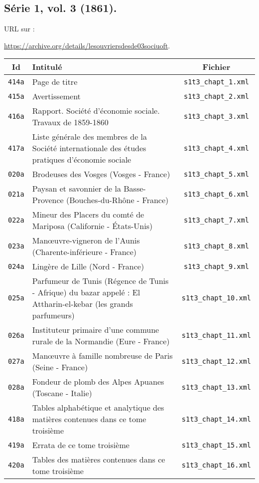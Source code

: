 \subsection{Série 1, vol. 3 (1861).}
\label{mappings1t3}

URL sur \ia{} : 

\url{https://archive.org/details/lesouvriersdesde03sociuoft}.

\begin{center}
\begin{longtable}{ | c | p{9.5cm} | c | }
\hline
Id & Intitulé & Fichier \\ \hline
\texttt{414a} & Page de titre & \texttt{s1t3\_chapt\_1.xml} \\ \hline
\texttt{415a} & Avertissement & \texttt{s1t3\_chapt\_2.xml} \\ \hline
\texttt{416a} & Rapport. Société d'économie sociale. Travaux de 1859-1860 & \texttt{s1t3\_chapt\_3.xml} \\ \hline
\texttt{417a} & Liste générale des membres de la Société internationale des études pratiques d'économie sociale & \texttt{s1t3\_chapt\_4.xml} \\ \hline
\texttt{020a} & Brodeuses des Vosges (Vosges - France) & \texttt{s1t3\_chapt\_5.xml} \\ \hline
\texttt{021a} & Paysan et savonnier de la Basse-Provence (Bouches-du-Rhône - France) & \texttt{s1t3\_chapt\_6.xml} \\ \hline
\texttt{022a} & Mineur des Placers du comté de Mariposa (Californie - États-Unis) & \texttt{s1t3\_chapt\_7.xml} \\ \hline
\texttt{023a} & Manœuvre-vigneron de l'Aunis (Charente-inférieure - France) & \texttt{s1t3\_chapt\_8.xml} \\ \hline
\texttt{024a} & Lingère de Lille (Nord - France) & \texttt{s1t3\_chapt\_9.xml} \\ \hline
\texttt{025a} & Parfumeur de Tunis (Régence de Tunis - Afrique) du bazar appelé : El Attharin-el-kebar (les grands parfumeurs) & \texttt{s1t3\_chapt\_10.xml} \\ \hline
\texttt{026a} & Instituteur primaire d'une commune rurale de la Normandie (Eure - France) & \texttt{s1t3\_chapt\_11.xml} \\ \hline
\texttt{027a} & Manœuvre à famille nombreuse de Paris (Seine - France) & \texttt{s1t3\_chapt\_12.xml} \\ \hline
\texttt{028a} & Fondeur de plomb des Alpes Apuanes (Toscane - Italie) & \texttt{s1t3\_chapt\_13.xml} \\ \hline
\texttt{418a} & Tables alphabétique et analytique des matières contenues dans ce tome troisième & \texttt{s1t3\_chapt\_14.xml} \\ \hline
\texttt{419a} & Errata de ce tome troisième & \texttt{s1t3\_chapt\_15.xml} \\ \hline
\texttt{420a} & Tables des matières contenues dans ce tome troisième & \texttt{s1t3\_chapt\_16.xml} \\ \hline
\end{longtable}
\end{center}

